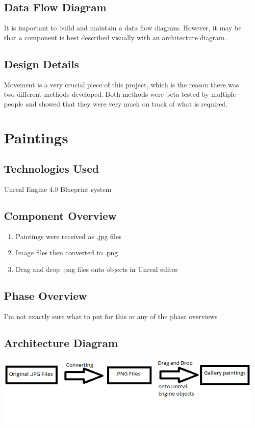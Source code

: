 \subsection{Data Flow Diagram}
It is important to build and maintain a data flow diagram.  However, it may be 
that a component is best described visually with an architecture diagram. 


\subsection{Design Details}
Movement is a very crucial piece of this project, which is the reason there was two different methods developed.  Both methods were beta tested by multiple people and showed that they were very much on track of what is required. 




\section{Paintings }

\subsection{Technologies  Used}
Unreal Engine 4.0 Blueprint system

\subsection{Component  Overview}
\begin{enumerate}
\item Paintings were received as .jpg files
\item Image files then converted to .png
\item Drag and drop .png files onto objects in Unreal editor
\end{enumerate}

\subsection{Phase Overview}
I'm not exactly sure what to put for this or any of the phase overviews 

\subsection{ Architecture  Diagram}
\includegraphics[scale=1.0]{Diagrams/PictureDiagram.png}
 


